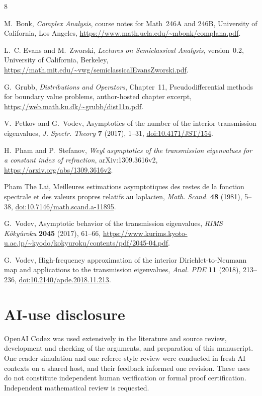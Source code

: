 \documentclass[11pt,a4paper]{article}
\theoremstyle{remark}
\numberwithin{equation}{section}
\begin{document}
\begin{thebibliography}{8}

M.~Bonk, \emph{Complex Analysis}, course notes for Math~246A and 246B,
University of California, Los Angeles,
\url{https://www.math.ucla.edu/~mbonk/complana.pdf}.

L.~C. Evans and M.~Zworski,
\emph{Lectures on Semiclassical Analysis}, version~0.2,
University of California, Berkeley,
\url{https://math.mit.edu/~vwg/semiclassicalEvansZworski.pdf}.

G.~Grubb, \emph{Distributions and Operators},
Chapter~11, Pseudodifferential methods for boundary value problems,
author-hosted chapter excerpt,
\url{https://web.math.ku.dk/~grubb/dist11n.pdf}.

V.~Petkov and G.~Vodev,
Asymptotics of the number of the interior transmission eigenvalues,
\emph{J. Spectr. Theory} \textbf{7} (2017), 1--31,
\href{https://doi.org/10.4171/JST/154}{doi:10.4171/JST/154}.

H.~Pham and P.~Stefanov,
\emph{Weyl asymptotics of the transmission eigenvalues for a constant
index of refraction}, arXiv:1309.3616v2,
\url{https://arxiv.org/abs/1309.3616v2}.

Pham The Lai,
Meilleures estimations asymptotiques des restes de la fonction spectrale
et des valeurs propres relatifs au laplacien,
\emph{Math. Scand.} \textbf{48} (1981), 5--38,
\href{https://doi.org/10.7146/math.scand.a-11895}{doi:10.7146/math.scand.a-11895}.

G.~Vodev, Asymptotic behavior of the transmission eigenvalues,
\emph{RIMS K\^oky\^uroku} \textbf{2045} (2017), 61--66,
\url{https://www.kurims.kyoto-u.ac.jp/~kyodo/kokyuroku/contents/pdf/2045-04.pdf}.

G.~Vodev,
High-frequency approximation of the interior Dirichlet-to-Neumann map
and applications to the transmission eigenvalues,
\emph{Anal. PDE} \textbf{11} (2018), 213--236,
\href{https://doi.org/10.2140/apde.2018.11.213}{doi:10.2140/apde.2018.11.213}.

\end{thebibliography}

\section*{AI-use disclosure}
OpenAI Codex was used extensively in the literature and source review,
development and checking of the arguments, and preparation of this
manuscript. One reader simulation and one referee-style review were
conducted in fresh AI contexts on a shared host, and their feedback informed
one revision. These uses do not constitute independent human verification
or formal proof certification. Independent mathematical review is requested.
\end{document}
